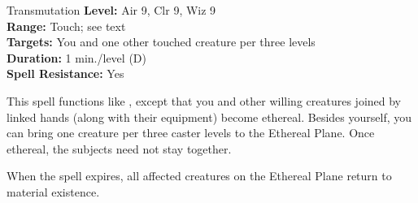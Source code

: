 {Transmutation}
{
	\textbf{Level:}
	Air 9, Clr 9, Wiz 9\\
	\textbf{Range:}
	Touch; see text\\
	\textbf{Targets:}
	You and one other touched creature per three levels\\
	\textbf{Duration:}
	1 min./level (D)\\
	\textbf{Spell Resistance:}
	Yes\\
}
{
	This spell functions like , except that you and other willing creatures joined by linked hands (along with their equipment) become ethereal. Besides yourself, you can bring one creature per three caster levels to the Ethereal Plane. Once ethereal, the subjects need not stay together.

	When the spell expires, all affected creatures on the Ethereal Plane return to material existence.

}
